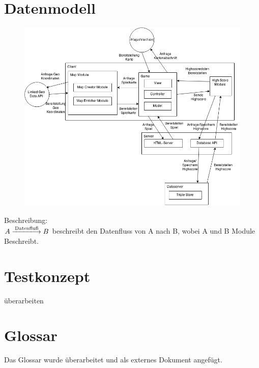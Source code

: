 \documentclass[11pt,a4paper]{article}
\begin{document}
\section{Datenmodell}

\begin{figure}[htb]
  \centering
  \includegraphics[scale=0.5]{Architecture.png}
  \label{PNFs}
\end{figure} 

Beschreibung: \\
$A \xlongrightarrow{\text{Datenfluß}} B $ beschreibt den Datenfluss von A nach B, wobei A und B Module Beschreibt.


\section{Testkonzept}
überarbeiten
\section{Glossar}
Das Glossar wurde überarbeitet und als externes Dokument angefügt.
\end{document}
